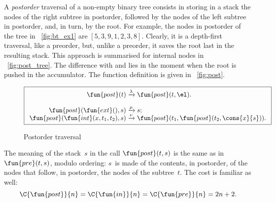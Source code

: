 A \emph{postorder} traversal of a
non\hyp{}empty binary tree consists in storing in a stack the nodes of
the right subtree in postorder, followed by the nodes of the left
subtree in postorder, and, in turn, by the root. For example, the
nodes in postorder of the tree in \fig~\vref{fig:bt_ex1} are
\([5,3,9,1,2,3,8]\). Clearly, it is a depth\hyp{}first
traversal, like a preorder,
but, unlike a preorder, it saves the root last in the resulting
stack. This approach is summarised for internal nodes in
\fig~\vref{fig:post_tree}. The difference with
 and 
lies in the moment when the root is pushed in the accumulator. The
function definition is given in \fig~\vref{fig:post}.
\begin{figure}
\begin{equation*}
\boxed{
\begin{array}{r@{\;}c@{\;}l}
\fun{post}(t) & \xrightarrow{\lambda} & \fun{post}(t,\el).\\
\\
\fun{post}(\fun{ext}(),s) & \xrightarrow{\smash{\mu}} & s;\\
\fun{post}(\fun{int}(x,t_1,t_2),s)
  & \xrightarrow{\smash{\nu}}
  & \fun{post}(t_1,\fun{post}(t_2,\cons{x}{s})).
\end{array}}
\end{equation*}
\caption{Postorder traversal}
\label{fig:post}
\end{figure}
The meaning of the stack~\(s\) in the call
\(\fun{post}(t,s)\)
is the same as in \(\fun{pre}(t,s)\), modulo ordering: \(s\)~is made
of the contents, in postorder, of the nodes that follow, in postorder,
the nodes of the subtree~\(t\). The cost is familiar as well:
\begin{equation*}
  \C{\fun{post}}{n} = \C{\fun{in}}{n} = \C{\fun{pre}}{n} = 2n + 2.
  \index{post@$\C{\fun{post}}{n}$}
\end{equation*}

